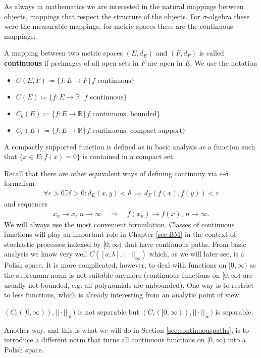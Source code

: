 As always in mathematics we are interested in the natural mappings between objects, mappings that respect the structure of the objects. For $\sigma$-algebra these were the measurable mappings, for metric spaces these are the continuous mappings:
\begin{ldef}
\begin{deff}
	A mapping between two metric spaces $(E,d_E)$ and $(F,d_F)$ is called \textbf{continuous} if preimages of all open sets in $F$ are open in $E$. We use the notation
	\begin{itemize}
		\item $C(E,F)\coloneqq  \{ f\colon E \to F \,|\, f \text{ continuous} \}$
		\item
			$C(E) \coloneqq \{ f\colon E \to \mathbb{R} \,|\, f \text{ continuous} \}$
		\item
			$C_b(E) \coloneqq \{ f\colon E \to \mathbb{R} \,|\, f \text{ continuous, bounded}\}$
		\item
			$C_c(E) \coloneqq \{ f\colon E \to \mathbb{R} \,|\, f \text{ continuous, compact support}\}$
	\end{itemize}
	A compactly supported function is defined as in basic analysis as a function such that $\{x\in E: f(x)=0\}$ is contained in a compact set.
\end{deff}
\end{ldef}
Recall that there are other equivalent ways of defining continuity via $\varepsilon$-$\delta$ formalism
\begin{align*}
	\forall \varepsilon>0 \exists \delta>0: d_E(x,y)<\delta \,\Rightarrow\, d_F(f(x),f(y))<\varepsilon
\end{align*}
and sequences
\begin{align*}
	x_n\to x, \,n\to\infty\quad \Longrightarrow\quad f(x_n)\to f(x), \, n\to\infty.
\end{align*}
We will always use the most convenient formulation. Classes of continuous functions will play an important role in Chapter \ref{sec:BM} in the context of stochastic processes indexed by $[0,\infty)$ that have continuous paths. From basic analysis we know very well $C([a,b],||\cdot ||_\infty)$ which, as we will later see, is a Polish space. It is more complicated, however, to deal with functions on $[0,\infty)$ as the supremum-norm is not suitable anymore (continuous functions on $[0,\infty)$ are usually not bounded, e.g. all polynomials are unbounded). One way is to restrict to less functions, which is already interesting from an analytic point of view:
\begin{laufmerksamkeit}
	$(C_b([0,\infty)), ||\cdot||_\infty)$ is not separable but $(C_c([0,\infty)), ||\cdot||_\infty)$ is separable.
\end{laufmerksamkeit}
Another way, and this is what we will do in Section \ref{sec:continuouspaths}, is to introduce a different norm that turns all continuous functions on $[0,\infty)$ into a Polish space.\smallskip


